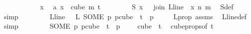 \begin{isabellebody}
\ \ \ \ \isamarkupfalse%
\isanewline
\ \ \ \ \ \isamarkupfalse%
\ x\ \isamarkupfalse%
\ a{\isacharcolon}{\kern0pt}\ {\isachardoublequoteopen}x\ {\isasymin}\ cube\ m\ {\isacharparenleft}{\kern0pt}t{\isacharplus}{\kern0pt}{}{\isacharparenright}{\kern0pt}{\isachardoublequoteclose}\isanewline
\ \ \ \ \ \isamarkupfalse%
\ \isamarkupfalse%
\ {\isachardoublequoteopen}{\isasymchi}S\ x\ {\isacharequal}{\kern0pt}\ {\isasymchi}\ {\isacharparenleft}{\kern0pt}join\ {\isacharparenleft}{\kern0pt}L{\isacharunderscore}{\kern0pt}line\ {}{\isacharparenright}{\kern0pt}\ x\ n\ m{\isacharparenright}{\kern0pt}{\isachardoublequoteclose}\ \isamarkupfalse%
\ {\isasymchi}S{\isacharunderscore}{\kern0pt}def\ \isamarkupfalse%
\ simp\isanewline
\ \ \ \ \ \isamarkupfalse%
\ \isamarkupfalse%
\ {\isachardoublequoteopen}L{\isacharunderscore}{\kern0pt}line\ {}\ {\isacharequal}{\kern0pt}\ L\ {\isacharparenleft}{\kern0pt}SOME\ p{\isachardot}{\kern0pt}\ p{\isasymin}cube\ {}\ {\isacharparenleft}{\kern0pt}t{\isacharplus}{\kern0pt}{}{\isacharparenright}{\kern0pt}\ {\isasymand}\ p\ {}\ {\isacharequal}{\kern0pt}\ {}{\isacharparenright}{\kern0pt}{\isachardoublequoteclose}\ \isamarkupfalse%
\ L{\isacharunderscore}{\kern0pt}prop\ assms{\isacharparenleft}{\kern0pt}{}{\isacharparenright}{\kern0pt}\ \isamarkupfalse%
\ L{\isacharunderscore}{\kern0pt}line{\isacharunderscore}{\kern0pt}def\ \isamarkupfalse%
\ simp\isanewline
\ \ \ \ \ \isamarkupfalse%
\ \isamarkupfalse%
\ {\isachardoublequoteopen}{\isacharparenleft}{\kern0pt}SOME\ p{\isachardot}{\kern0pt}\ p{\isasymin}cube\ {}\ {\isacharparenleft}{\kern0pt}t{\isacharplus}{\kern0pt}{}{\isacharparenright}{\kern0pt}\ {\isasymand}\ p\ {}\ {\isacharequal}{\kern0pt}\ {}{\isacharparenright}{\kern0pt}\ {\isasymin}\ cube\ {}\ {\isacharparenleft}{\kern0pt}t{\isacharplus}{\kern0pt}{}{\isacharparenright}{\kern0pt}{\isachardoublequoteclose}\ \isamarkupfalse%
\ cube{\isacharunderscore}{\kern0pt}props{\isacharparenleft}{\kern0pt}{}{\isacharparenright}{\kern0pt}{\isacharbrackleft}{\kern0pt}of\ {\isachardoublequoteopen}t{\isacharplus}{\kern0pt}{}{\isachardoublequoteclose}{\isacharbrackright}{\kern0pt}\ \isamarkupfalse%

\end{isabellebody}
